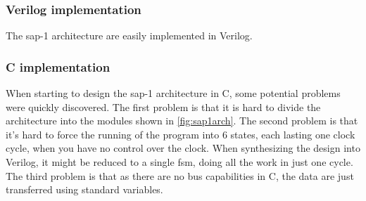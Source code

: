 \subsubsection{Verilog implementation}
The \gls{sap-1} architecture are easily implemented in Verilog. 
\subsubsection{C implementation}
When starting to design the \gls{sap-1} architecture in C, some potential problems were quickly discovered. The first problem is that it is hard to divide the architecture into the modules shown in \cref{fig:sap1arch}. The second problem is that it's hard to force the running of the program into 6 states, each lasting one clock cycle, when you have no control over the clock. When synthesizing the design into Verilog, it might be reduced to a single \gls{fsm}, doing all the work in just one cycle. The third problem is that as there are no bus capabilities in C, the data are just transferred using standard variables.

